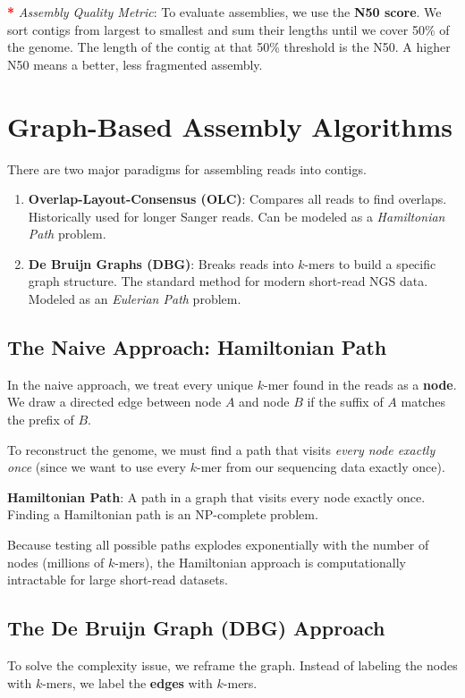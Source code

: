 \documentclass[11pt, a4paper]{article}
\newcommand{\sta}{\textbf{\textcolor{red}{*}} }
\begin{document}
\sta \textit{Assembly Quality Metric}: To evaluate assemblies, we use the \textbf{N50 score}. We sort contigs from largest to smallest and sum their lengths until we cover 50\% of the genome. The length of the contig at that 50\% threshold is the N50. A higher N50 means a better, less fragmented assembly.

\section{Graph-Based Assembly Algorithms}
There are two major paradigms for assembling reads into contigs.
\begin{enumerate}
    \item \textbf{Overlap-Layout-Consensus (OLC)}: Compares all reads to find overlaps. Historically used for longer Sanger reads. Can be modeled as a \textit{Hamiltonian Path} problem.
    \item \textbf{De Bruijn Graphs (DBG)}: Breaks reads into $k$-mers to build a specific graph structure. The standard method for modern short-read NGS data. Modeled as an \textit{Eulerian Path} problem.
\end{enumerate}

\subsection{The Naive Approach: Hamiltonian Path}
In the naive approach, we treat every unique $k$-mer found in the reads as a \textbf{node}. We draw a directed edge between node $A$ and node $B$ if the suffix of $A$ matches the prefix of $B$.

To reconstruct the genome, we must find a path that visits \textit{every node exactly once} (since we want to use every $k$-mer from our sequencing data exactly once). 

\begin{important}
    \textbf{Hamiltonian Path}: A path in a graph that visits every node exactly once. Finding a Hamiltonian path is an NP-complete problem. 
\end{important}

Because testing all possible paths explodes exponentially with the number of nodes (millions of $k$-mers), the Hamiltonian approach is computationally intractable for large short-read datasets.

\subsection{The De Bruijn Graph (DBG) Approach}
To solve the complexity issue, we reframe the graph. Instead of labeling the nodes with $k$-mers, we label the \textbf{edges} with $k$-mers. 
\end{document}
